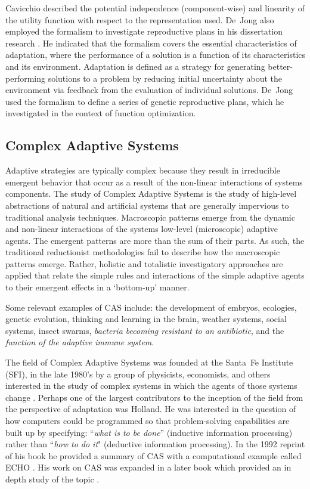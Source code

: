 \documentclass[a4paper, 11pt]{article}
\begin{document}
Cavicchio described the potential independence (component-wise) and linearity of the utility function with respect to the representation used. De~Jong also employed the formalism to investigate reproductive plans in his dissertation research \cite{Jong1975}. He indicated that the formalism covers the essential characteristics of adaptation, where the performance of a solution is a function of its characteristics and its environment. Adaptation is defined as a strategy for generating better-performing solutions to a problem by reducing initial uncertainty about the environment via feedback from the evaluation of individual solutions. De~Jong used the formalism to define a series of genetic reproductive plans, which he investigated in the context of function optimization.

\subsection{Complex Adaptive Systems}
Adaptive strategies are typically complex because they result in irreducible emergent behavior that occur as a result of the non-linear interactions of systems components.
The study of Complex Adaptive Systems is the study of high-level abstractions of natural and artificial systems that are generally impervious to traditional analysis techniques. Macroscopic patterns emerge from the dynamic and non-linear interactions of the systems low-level (microscopic) adaptive agents. The emergent patterns are more than the sum of their parts. As such, the traditional reductionist methodologies fail to describe how the macroscopic patterns emerge. Rather, holistic and totalistic investigatory approaches are applied that relate the simple rules and interactions of the simple adaptive agents to their emergent effects in a `bottom-up' manner. 

Some relevant examples of CAS include: the development of embryos, ecologies, genetic evolution, thinking and learning in the brain, weather systems, social systems, insect swarms, \emph{bacteria becoming resistant to an antibiotic}, and the \emph{function of the adaptive immune system}. 

The field of Complex Adaptive Systems was founded at the Santa~Fe Institute (SFI), in the late 1980's by a group of physicists, economists, and others interested in the study of complex systems in which the agents of those systems change \cite{Anderson1988}. Perhaps one of the largest contributors to the inception of the field from the perspective of adaptation was Holland. He was interested in the question of how computers could be programmed so that problem-solving capabilities are built up by specifying: ``\emph{what is to be done}'' (inductive information processing) rather than ``\emph{how to do it}" (deductive information processing). In the 1992 reprint of his book he provided a summary of CAS with a computational example called ECHO \cite{Holland1975}. His work on CAS was expanded in a later book which provided an in depth study of the topic \cite{Holland1995}.
 
\end{document}
